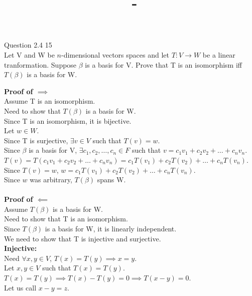 \documentclass[answers,12pt,addpoints]{exam}
\author{\name}
\title{\course \ - \assignment}
\begin{document}
\maketitle


\newpage
\begin{questions}
    \question Question 2.4 15\\
    Let V and W be $n$-dimensional vectors spaces and let $T:V \to W$ be a linear tranformation. Suppose $\beta$ is a basis for V. Prove that T is an isomorphism iff $T(\beta)$ is a basis for W.
    \begin{solution}
        \textbf{Proof of $\implies$}\\
        Assume T is an isomorphism. \\
        Need to show that $T(\beta)$ is a basis for W.\\
        Since T is an isomorphism, it is bijective.\\
        Let $w \in W$.\\
        Since T is surjective, $\exists v \in V$ such that $T(v) = w$.\\
        Since $\beta$ is a basis for V, $\exists c_1, c_2, \dots, c_n \in F$ such that $v = c_1v_1 + c_2v_2 + \dots + c_nv_n$.\\
        $T(v) = T(c_1v_1 + c_2v_2 + \dots + c_nv_n) = c_1T(v_1) + c_2T(v_2) + \dots + c_nT(v_n)$.\\
        Since $T(v) = w$, $w = c_1T(v_1) + c_2T(v_2) + \dots + c_nT(v_n)$.\\
        Since $w$ was arbitrary, $T(\beta)$ spans W.\\\\
        \textbf{Proof of $\impliedby$}\\
        Assume $T(\beta)$ is a basis for W.\\
        Need to show that T is an isomorphism.\\
        Since $T(\beta)$ is a basis for W, it is linearly independent.\\
        We need to show that T is injective and surjective.\\
        \textbf{Injective:}\\
        Need $\forall x,y \in V$, $T(x) = T(y) \implies x = y$.\\
        Let $x,y \in V$ such that $T(x) = T(y)$.\\
        $T(x) = T(y) \implies T(x) - T(y) = 0 \implies T(x-y) = 0$.\\
        Let us call $x-y = z$.\\

\end{solution}
\end{questions}
\end{document}
